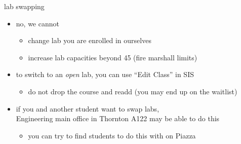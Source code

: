 \begin{frame}{lab swapping}
    \begin{itemize}
    \item no, we cannot 
    \begin{itemize}
        \item change lab you are enrolled in ourselves
        \item increase lab capacities beyond 45 (fire marshall limits)
        \end{itemize}
    \item to switch to an \textit{open} lab, you can use ``Edit Class'' in SIS
        \begin{itemize}
        \item do not drop the course and readd (you may end up on the waitlist)
        \end{itemize}
    \item if you and another student want to swap labs, \\
          Engineering main office in Thornton A122 may be able to do this
        \begin{itemize}
        \item you can try to find students to do this with on Piazza
        \end{itemize}
    \end{itemize}
\end{frame}

